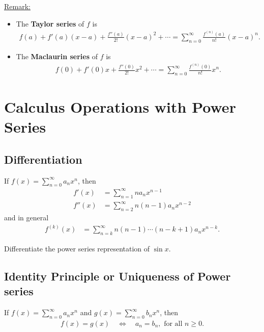\documentclass[12pt,a4paper]{article}
\newcounter{example}[section]
\begin{document}
\vspace*{20pt}
	
\underline{Remark:} 
\begin{itemize}
\item The \textbf{Taylor series} of $f$ is
	\begin{align*}
	f(a) + f'(a) (x - a) + \frac{f''(a)}{2!} (x - a)^2 + \cdots = \sum_{n = 0}^\infty \frac{f^{(n)}(a)}{n!} (x - a)^n .
	\end{align*}
\item The \textbf{Maclaurin series} of $f$ is
	\begin{align*}
	f(0) + f'(0) x + \frac{f''(0)}{2!} x^2 + \cdots = \sum_{n = 0}^\infty \frac{f^{(n)} (0)}{n!} x^n .
	\end{align*}
\end{itemize}
	
\newpage
	
\section{Calculus Operations with Power Series}

\subsection{Differentiation}
If $f(x) = \sum_{n = 0}^\infty a_n x^n$, then
	\begin{align*}
	f'(x) &= \sum_{n = 1}^\infty n a_n x^{n-1} \\
	f''(x) &= \sum_{n = 2}^\infty n (n - 1) a_n x^{n-2} 
	\end{align*}
and in general
	\begin{align*}
	f^{(k)} (x) &= \sum_{n = k}^\infty n (n - 1) \cdots (n - k + 1) a_n x^{n- k} .
	\end{align*}
	
\begin{example}
Differentiate the power series representation of $\sin x$.
\end{example}


\newpage
	
\subsection{Identity Principle or Uniqueness of Power series}
If $f(x) = \sum_{n = 0}^\infty a_n x^n$ and $g(x) = \sum_{n = 0}^\infty b_n x^n$, then
	\begin{align*}
	f(x) = g(x) \quad \iff \quad a_n = b_n , \text{ for all } n \geq 0 .
	\end{align*}
\end{document}
